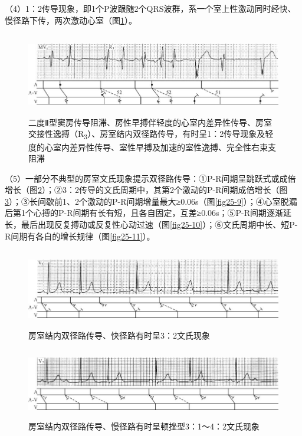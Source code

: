 （4）1：2传导现象，即1个P波跟随2个QRS波群，系一个室上性激动同时经快、慢径路下传，两次激动心室（图\ref{fig25-6}）。

\begin{figure}[!htbp]
 \centering
 \includegraphics[width=5.80208in,height=1.40625in]{./images/Image00417.jpg}
 \captionsetup{justification=centering}
 \caption{二度Ⅱ型窦房传导阻滞、房性早搏伴轻度的心室内差异性传导、房室交接性逸搏（R\textsubscript{3}）、房室结内双径路传导，有时呈1：2传导现象及轻度的心室内差异性传导、室性早搏及加速的室性逸搏、完全性右束支阻滞}
 \label{fig25-6}
  \end{figure} 


（5）一部分不典型的房室文氏现象提示双径路传导：①P-R间期呈跳跃式或成倍增长（图\ref{fig25-7}）；②3：2传导的文氏周期中，其第2个激动的P-R间期成倍增长（图\ref{fig25-8}）；③长间歇前1、2个激动的P-R间期增量最大≥0.06s（图\ref{fig25-9}）；④心室脱漏后第1个心搏的P-R间期有长有短，且各自固定，互差≥0.06s；⑤P-R间期逐渐延长，最后出现反复搏动或反复性心动过速（图\ref{fig25-10}）；⑥文氏周期中长、短P-R间期有各自的增长规律（图\ref{fig25-11}）。

\begin{figure}[!htbp]
 \centering
 \includegraphics[width=5.80208in,height=1.35417in]{./images/Image00418.jpg}
 \captionsetup{justification=centering}
 \caption{房室结内双径路传导、快径路有时呈3：2文氏现象}
 \label{fig25-7}
  \end{figure} 

\begin{figure}[!htbp]
 \centering
 \includegraphics[width=5.80208in,height=1.20833in]{./images/Image00419.jpg}
 \captionsetup{justification=centering}
 \caption{房室结内双径路传导、慢径路有时呈顿挫型3：1～4：2文氏现象}
 \label{fig25-8}
  \end{figure} 

